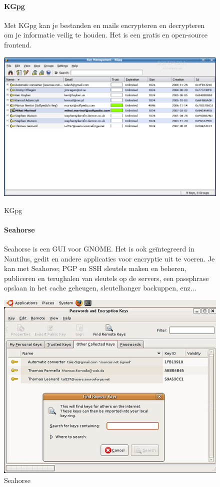 \documentclass[12pt]{article}
\begin{document}
				\begin{figure}[!ht]				
					\paragraph{KGpg}\cite{Kgpg}
						Met KGpg kan je bestanden en mails encrypteren en decrypteren om je informatie veilig te houden.
						Het is een gratis en open-source frontend.
					\begin{center}
						\includegraphics[scale=0.2]{Pictures/kgpg}
					\end{center}
					\caption{KGpg}
				
					\paragraph{Seahorse} \cite{Seahorse}
						Seahorse is een GUI voor GNOME. Het is ook geïntegreerd in Nautilus, gedit en andere applicaties voor encryptie uit te voeren.
						Je kan met Seahorse; PGP en SSH sleutels maken en beheren, publiceren en terughalen van sleutels op de servers, een passphrase opslaan in het cache geheugen, 								sleutelhanger backuppen, enz...
					\begin{center}
						\includegraphics[scale=0.4]{Pictures/Seahorse}
					\end{center}
					\caption{Seahorse}
				\end{figure}
				
\end{document}
